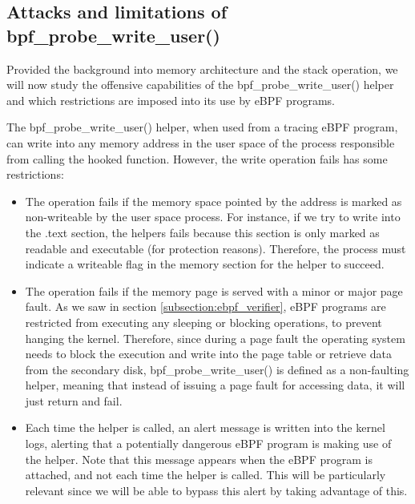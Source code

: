 \subsection{Attacks and limitations of bpf\_probe\_write\_user()} \label{subsection:bpf_probe_write_apps}
Provided the background into memory architecture and the stack operation, we will now study the offensive capabilities of the bpf\_probe\_write\_user() helper and which restrictions are imposed into its use by eBPF programs.

The bpf\_probe\_write\_user() helper, when used from a tracing eBPF program, can write into any memory address in the user space of the process responsible from calling the hooked function. However, the write operation fails has some restrictions:
\begin{itemize}
\item{The operation fails if the memory space pointed by the address is marked as non-writeable by the user space process. For instance, if we try to write into the .text section, the helpers fails because this section is only marked as readable and executable (for protection reasons).} Therefore, the process must indicate a writeable flag in the memory section for the helper to succeed.
\item{The operation fails if the memory page is served with a minor or major page fault. As we saw in section \ref{subsection:ebpf_verifier}, eBPF programs are restricted from executing any sleeping or blocking operations, to prevent hanging the kernel. Therefore, since during a page fault the operating system needs to block the execution and write into the page table or retrieve data from the secondary disk, bpf\_probe\_write\_user() is defined as a non-faulting helper\cite{write_helper_non_fault}, meaning that instead of issuing a page fault for accessing data, it will just return and fail.}
\item{Each time the helper is called, an alert message is written into the kernel logs, alerting that a potentially dangerous eBPF program is making use of the helper. Note that this message appears when the eBPF program is attached, and not each time the helper is called. This will be particularly relevant since we will be able to bypass this alert by taking advantage of this.}
\end{itemize}

